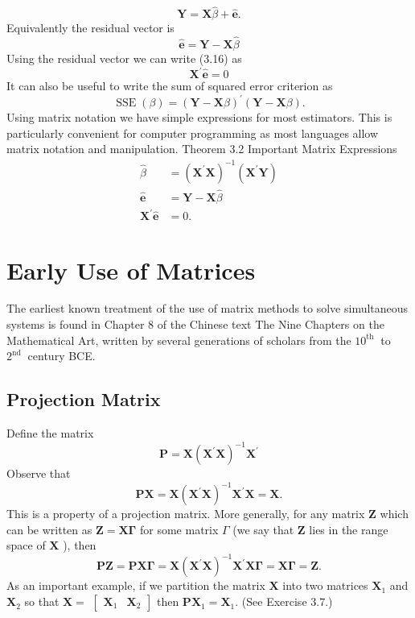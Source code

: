\documentclass[10pt]{article}
\begin{document}
$$
\boldsymbol{Y}=\boldsymbol{X} \widehat{\beta}+\widehat{\boldsymbol{e}} .
$$
Equivalently the residual vector is
$$
\widehat{\boldsymbol{e}}=\boldsymbol{Y}-\boldsymbol{X} \widehat{\beta}
$$
Using the residual vector we can write (3.16) as
$$
\boldsymbol{X}^{\prime} \widehat{\boldsymbol{e}}=0
$$
It can also be useful to write the sum of squared error criterion as
$$
\operatorname{SSE}(\beta)=(\boldsymbol{Y}-\boldsymbol{X} \beta)^{\prime}(\boldsymbol{Y}-\boldsymbol{X} \beta) .
$$
Using matrix notation we have simple expressions for most estimators. This is particularly convenient for computer programming as most languages allow matrix notation and manipulation. Theorem 3.2 Important Matrix Expressions
$$
\begin{aligned}
\widehat{\beta} &=\left(\boldsymbol{X}^{\prime} \boldsymbol{X}\right)^{-1}\left(\boldsymbol{X}^{\prime} \boldsymbol{Y}\right) \\
\widehat{\boldsymbol{e}} &=\boldsymbol{Y}-\boldsymbol{X} \widehat{\beta} \\
\boldsymbol{X}^{\prime} \widehat{\boldsymbol{e}} &=0 .
\end{aligned}
$$

\section{Early Use of Matrices}
The earliest known treatment of the use of matrix methods to solve simultaneous systems is found in Chapter 8 of the Chinese text The Nine Chapters on the Mathematical Art, written by several generations of scholars from the $10^{\text {th }}$ to $2^{\text {nd }}$ century BCE.

\subsection{Projection Matrix}
Define the matrix
$$
\boldsymbol{P}=\boldsymbol{X}\left(\boldsymbol{X}^{\prime} \boldsymbol{X}\right)^{-1} \boldsymbol{X}^{\prime}
$$
Observe that
$$
\boldsymbol{P} \boldsymbol{X}=\boldsymbol{X}\left(\boldsymbol{X}^{\prime} \boldsymbol{X}\right)^{-1} \boldsymbol{X}^{\prime} \boldsymbol{X}=\boldsymbol{X} .
$$
This is a property of a projection matrix. More generally, for any matrix $\boldsymbol{Z}$ which can be written as $\boldsymbol{Z}=\boldsymbol{X} \boldsymbol{\Gamma}$ for some matrix $\Gamma$ (we say that $\boldsymbol{Z}$ lies in the range space of $\boldsymbol{X}$ ), then
$$
\boldsymbol{P Z}=\boldsymbol{P} \boldsymbol{X} \boldsymbol{\Gamma}=\boldsymbol{X}\left(\boldsymbol{X}^{\prime} \boldsymbol{X}\right)^{-1} \boldsymbol{X}^{\prime} \boldsymbol{X} \boldsymbol{\Gamma}=\boldsymbol{X} \boldsymbol{\Gamma}=\boldsymbol{Z} .
$$
As an important example, if we partition the matrix $\boldsymbol{X}$ into two matrices $\boldsymbol{X}_{1}$ and $\boldsymbol{X}_{2}$ so that $\boldsymbol{X}=$ $\left[\begin{array}{ll}\boldsymbol{X}_{1} & \boldsymbol{X}_{2}\end{array}\right]$ then $\boldsymbol{P} \boldsymbol{X}_{1}=\boldsymbol{X}_{1}$. (See Exercise 3.7.)
\end{document}

